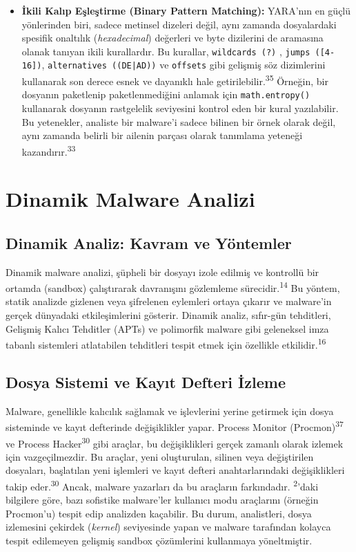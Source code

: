 \begin{itemize}
    \item \textbf{İkili Kalıp Eşleştirme (Binary Pattern Matching):} YARA'nın en güçlü yönlerinden biri, sadece metinsel dizeleri değil, aynı zamanda dosyalardaki spesifik onaltılık (\textit{hexadecimal}) değerleri ve byte dizilerini de aramasına olanak tanıyan ikili kurallardır. Bu kurallar, \texttt{wildcards (?)} , \texttt{jumps ([4-16])}, \texttt{alternatives ((DE|AD))} ve \texttt{offsets} gibi gelişmiş söz dizimlerini kullanarak son derece esnek ve dayanıklı hale getirilebilir.\textsuperscript{35} Örneğin, bir dosyanın paketlenip paketlenmediğini anlamak için \texttt{math.entropy()} kullanarak dosyanın rastgelelik seviyesini kontrol eden bir kural yazılabilir. Bu yetenekler, analiste bir malware'i sadece bilinen bir örnek olarak değil, aynı zamanda belirli bir ailenin parçası olarak tanımlama yeteneği kazandırır.\textsuperscript{33}
\end{itemize}

\section{Dinamik Malware Analizi}

\subsection{Dinamik Analiz: Kavram ve Yöntemler}

Dinamik malware analizi, şüpheli bir dosyayı izole edilmiş ve kontrollü bir ortamda (sandbox) çalıştırarak davranışını gözlemleme sürecidir.\textsuperscript{14} Bu yöntem, statik analizde gizlenen veya şifrelenen eylemleri ortaya çıkarır ve malware'in gerçek dünyadaki etkileşimlerini gösterir. Dinamik analiz, sıfır-gün tehditleri, Gelişmiş Kalıcı Tehditler (APTs) ve polimorfik malware gibi geleneksel imza tabanlı sistemleri atlatabilen tehditleri tespit etmek için özellikle etkilidir.\textsuperscript{16}

\subsection{Dosya Sistemi ve Kayıt Defteri İzleme}

Malware, genellikle kalıcılık sağlamak ve işlevlerini yerine getirmek için dosya sisteminde ve kayıt defterinde değişiklikler yapar. Process Monitor (Procmon)\textsuperscript{37} ve Process Hacker\textsuperscript{30} gibi araçlar, bu değişiklikleri gerçek zamanlı olarak izlemek için vazgeçilmezdir. Bu araçlar, yeni oluşturulan, silinen veya değiştirilen dosyaları, başlatılan yeni işlemleri ve kayıt defteri anahtarlarındaki değişiklikleri takip eder.\textsuperscript{30} Ancak, malware yazarları da bu araçların farkındadır. \textsuperscript{2}'daki bilgilere göre, bazı sofistike malware'ler kullanıcı modu araçlarını (örneğin Procmon'u) tespit edip analizden kaçabilir. Bu durum, analistleri, dosya izlemesini çekirdek (\textit{kernel}) seviyesinde yapan ve malware tarafından kolayca tespit edilemeyen gelişmiş sandbox çözümlerini kullanmaya yöneltmiştir.

